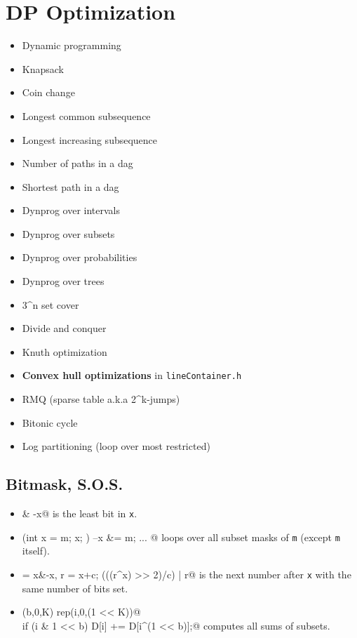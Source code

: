 \section{DP Optimization}
    \begin{itemize}
        \item Dynamic programming
        \item Knapsack
        \item Coin change
        \item Longest common subsequence
        \item Longest increasing subsequence
        \item Number of paths in a dag
        \item Shortest path in a dag
        \item Dynprog over intervals
        \item Dynprog over subsets
        \item Dynprog over probabilities
        \item Dynprog over trees
        \item 3^n set cover
        \item Divide and conquer
        \item Knuth optimization
        \item \textbf{Convex hull optimizations} in \texttt{lineContainer.h}
        \item RMQ (sparse table a.k.a 2^k-jumps)
        \item Bitonic cycle
        \item Log partitioning (loop over most restricted)
    \end{itemize}

    \subsection{Bitmask, S.O.S.}
        \begin{itemize}
            \item \verb@x & -x@ is the least bit in \texttt{x}.
            \item \verb@for (int x = m; x; ) { --x &= m; ... }@ loops over all subset masks of \texttt{m} (except \texttt{m} itself).
            \item \verb@c = x&-x, r = x+c; (((r^x) >> 2)/c) | r@ is the next number after \texttt{x} with the same number of bits set.
            \item \verb@rep(b,0,K) rep(i,0,(1 << K))@ \\ \verb@  if (i & 1 << b) D[i] += D[i^(1 << b)];@ computes all sums of subsets.
        \end{itemize}